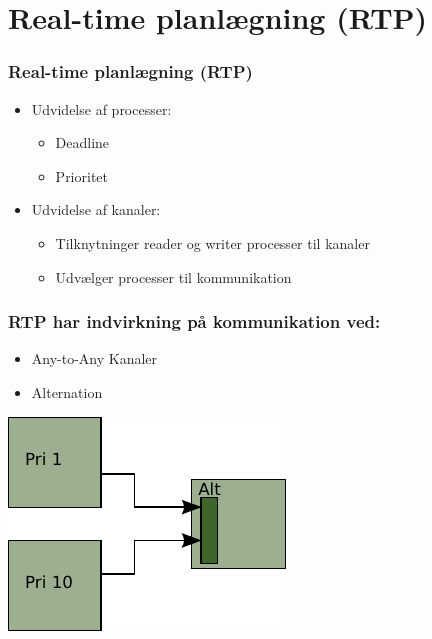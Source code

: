 \documentclass[12pt]{beamer}
\begin{document}
\section{Real-time planlægning (RTP)}

\begin{frame}
  \frametitle{Real-time planlægning (RTP)}
  \begin{itemize}
	\item Udvidelse af processer:
	  \begin{itemize}   
		\item Deadline
		\item Prioritet	
	  \end{itemize}
	\item Udvidelse af kanaler:
	  \begin{itemize}   
		\item Tilknytninger reader og writer processer til kanaler
		\item Udvælger processer til kommunikation
	  \end{itemize}
\end{itemize}
\end{frame}


\begin{frame}
	\frametitle{RTP har indvirkning på kommunikation ved:}
	\begin{itemize}
		\item Any-to-Any Kanaler 
	 	\item Alternation
	\end{itemize} 
\begin{center}
	\includegraphics[scale=0.7]{alt-inheritance.pdf} 
\end{center}
\end{frame} 
\end{document}
